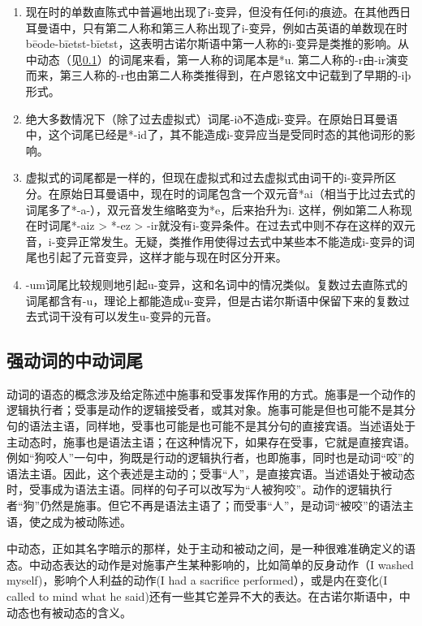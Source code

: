 \begin{enumerate}
    \item
          现在时的单数直陈式中普遍地出现了i-变异，但没有任何i的痕迹。在其他西日耳曼语中，只有第二人称和第三人称出现了i-变异，例如古英语的单数现在时bēode-bīetst-bīetst，这表明古诺尔斯语中第一人称的i-变异是类推的影响。从中动态（见\ref{强动词的中动词尾}）的词尾来看，第一人称的词尾本是*u.
          第二人称的-r由-ir演变而来，第三人称的-r也由第二人称类推得到，在卢恩铭文中记载到了早期的-iþ形式。
    \item
          绝大多数情况下（除了过去虚拟式）词尾-ið不造成i-变异。在原始日耳曼语中，这个词尾已经是*-id了，其不能造成i-变异应当是受同时态的其他词形的影响。
    \item
          \label{_Ref116919964}{}虚拟式的词尾都是一样的，但现在虚拟式和过去虚拟式由词干的i-变异所区分。在原始日耳曼语中，现在时的词尾包含一个双元音*ai（相当于比过去式的词尾多了*-a-），双元音发生缩略变为*e，后来抬升为i.
          这样，例如第二人称现在时词尾*-aiz > *-ez > -ir就没有i-变异条件。在过去式中则不存在这样的双元音，i-变异正常发生。无疑，类推作用使得过去式中某些本不能造成i-变异的词尾也引起了元音变异，这样才能与现在时区分开来。
    \item
          -um词尾比较规则地引起u-变异，这和名词中的情况类似。复数过去直陈式的词尾都含有-u，理论上都能造成u-变异，但是古诺尔斯语中保留下来的复数过去式词干没有可以发生u-变异的元音。
\end{enumerate}

\subsection{强动词的中动词尾}\label{强动词的中动词尾}

动词的语态的概念涉及给定陈述中施事和受事发挥作用的方式。施事是一个动作的逻辑执行者；受事是动作的逻辑接受者，或其对象。施事可能是但也可能不是其分句的语法主语，同样地，受事也可能是也可能不是其分句的直接宾语。当述语处于主动态时，施事也是语法主语；在这种情况下，如果存在受事，它就是直接宾语。例如``狗咬人''一句中，狗既是行动的逻辑执行者，也即施事，同时也是动词``咬''的语法主语。因此，这个表述是主动的；受事``人''，是直接宾语。当述语处于被动态时，受事成为语法主语。同样的句子可以改写为``人被狗咬''。动作的逻辑执行者``狗''仍然是施事。但它不再是语法主语了；而受事``人''，是动词``被咬''的语法主语，使之成为被动陈述。

中动态，正如其名字暗示的那样，处于主动和被动之间，是一种很难准确定义的语态。中动态表达的动作是对施事产生某种影响的，比如简单的反身动作（I washed myself‌)，影响个人利益的动作(I had a sacrifice performed），或是内在变化(I called to mind what he said)还有一些其它差异不大的表达。在古诺尔斯语中，中动态也有被动态的含义。

